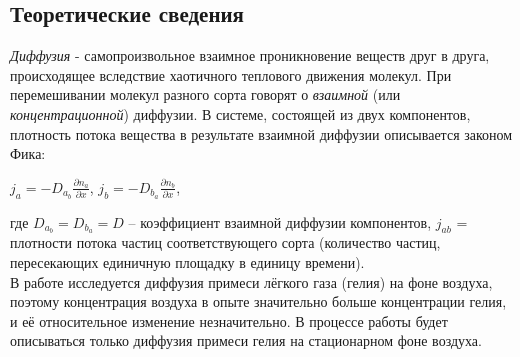 \documentclass[a4paper, 12pt]{article}
\begin{document}
    \bigskip
    \begin{center}

\subsection*{Теоретические сведения}

{\sl Диффузия} - самопроизвольное взаимное проникновение веществ друг в друга, происходящее вследствие хаотичного теплового движения молекул. При перемешивании молекул разного сорта говорят о {\sl взаимной} (или {\sl концентрационной}) диффузии.
В системе, состоящей из двух компонентов, плотность потока вещества в результате взаимной диффузии описывается законом Фика:

\bigskip

\begin{center}
$\displaystyle j_a = -D_a_b\frac{\partial n_a}{\partial x}$, $\displaystyle j_b = -D_b_a\frac{\partial n_b}{\partial x}$,
\end{center}

\bigskip

где $D_a_b = D_b_a = D$ -- коэффициент взаимной диффузии компонентов, $j_{ab}$ = плотности потока частиц соответствующего сорта (количество частиц, пересекающих единичную площадку в единицу времени).\\
В работе исследуется диффузия примеси лёгкого газа (гелия) на фоне воздуха, поэтому концентрация воздуха в опыте значительно больше концентрации гелия, и её относительное изменение незначительно. В процессе работы будет описываться только диффузия примеси гелия на стационарном фоне воздуха.\\


\end{center}
\end{document}
